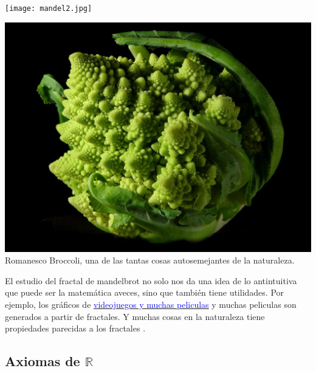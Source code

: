 \documentclass[a4paper,11pt,spanish,sans]{exam}
\begin{document}
\begin{itemize}
\begin{minipage}{0.5\textwidth}
\end{minipage}
\begin{minipage}{0.5\textwidth}
	
	\centering
	\texttt{[image: mandel2.jpg]}
	\label{fig:erise}
	
	\end{minipage}		
\begin{minipage}{0.5\textwidth}
	
	\centering
	\includegraphics[width= 0.72\linewidth]{Fractal_Broccoli.jpg}\\
	Romanesco Broccoli, una de las tantas cosas autosemejantes de la naturaleza.
	\label{fig:broccoli}
	
\end{minipage}	
				
					
El estudio del fractal de mandelbrot no solo nos da una idea de lo antintuitiva que puede ser la matemática aveces, sino que también tiene utilidades.
Por ejemplo, los gráficos de \href{https://www.youtube.com/watch?v=s65DSz78jW4}{\textcolor{blue}{videojuegos y muchas peliculas}} y muchas peliculas son generados a partir de fractales. Y muchas cosas en la naturaleza tiene propiedades parecidas a los fractales .

	
\end{itemize}


\newpage

	\begin{center}
		\section*{Axiomas de $\mathbb{R}$}
	\end{center}
	
\end{document}
